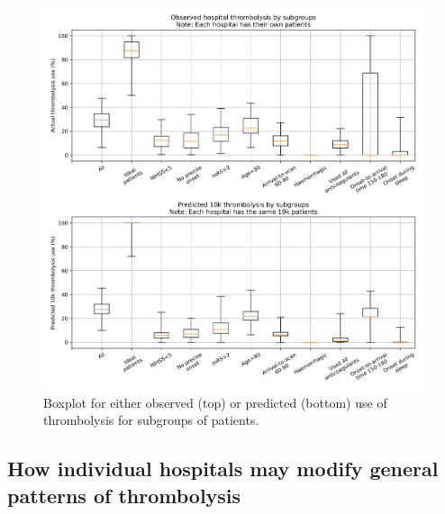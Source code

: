 \begin{figure}[!h]
\centering
\includegraphics[width=1\textwidth]{./images/15a_xgb_10_features_10k_cohort_actual_vs_modelled_subgroup_violin}
\caption{Boxplot for either observed (top) or predicted (bottom) use of thrombolysis for subgroups of patients.}
\label{fig:results_boxplot}
\end{figure}


\iffalse

\subsection{How individual hospitals may modify general patterns of thrombolysis}


